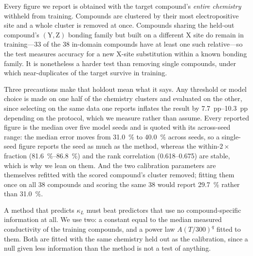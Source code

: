 Every figure we report is obtained with the target compound's \emph{entire chemistry} withheld from
training. Compounds are clustered by their most electropositive site and a whole cluster is removed
at once. Compounds sharing the held-out compound's $(\mathrm{Y},\mathrm{Z})$ bonding family but
built on a different X site do remain in training---\num{33} of the \num{38} in-domain compounds
have at least one such relative---so the test measures accuracy for a new X-site substitution
within a known bonding family. It is nonetheless a harder test than removing single compounds,
under which near-duplicates of the target survive in training.

Three precautions make that holdout mean what it says. Any threshold or model choice is made on one
half of the chemistry clusters and evaluated on the other, since selecting on the same data one
reports inflates the result by \SIrange{7.7}{10.3}{pp} depending on the protocol, which we measure
rather than assume. Every reported figure is the median over five model seeds and is quoted with
its across-seed range: the median error moves from \SI{31.0}{\percent} to \SI{40.0}{\percent}
across seeds, so a single-seed figure reports the seed as much as the method, whereas the
within-$2\times$ fraction (\SIrange{81.6}{86.8}{\percent}) and the rank correlation
(\numrange{0.618}{0.675}) are stable, which is why we lean on them. And the two calibration
parameters are themselves refitted with the scored compound's cluster removed; fitting them once on
all \num{38} compounds and scoring the same \num{38} would report \SI{29.7}{\percent} rather than
\SI{31.0}{\percent}.

A method that predicts $\kappa_L$ must beat predictors that use no compound-specific information at
all. We use two: a constant equal to the median measured conductivity of the training compounds,
and a power law $A(T/300)^{q}$ fitted to them. Both are fitted with the same chemistry held out as
the calibration, since a null given less information than the method is not a test of anything.


